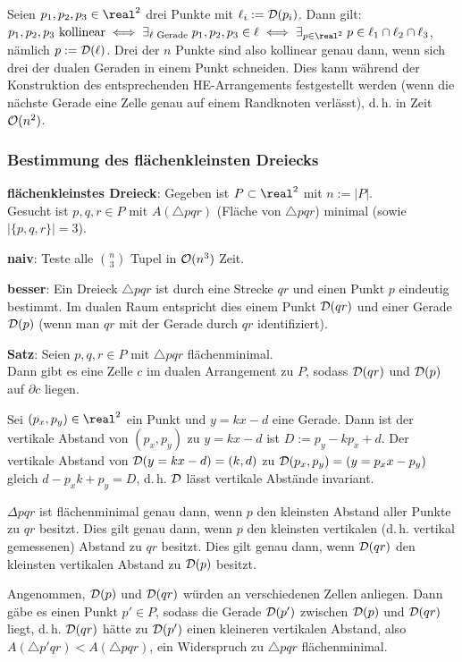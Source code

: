 Seien $p_1, p_2, p_3 \in \real^2$ drei Punkte mit $\ell_i := \mathcal{D}(p_i)$.
Dann gilt:\\
$p_1, p_2, p_3 \text{ kollinear} \iff
\exists_{\ell \text{ Gerade}}\; p_1, p_2, p_3 \in \ell \iff
\exists_{p \in \real^2}\; p \in \ell_1 \cap \ell_2 \cap \ell_3$,
nämlich $p := \mathcal{D}(\ell)$.
Drei der $n$ Punkte sind also kollinear genau dann, wenn sich drei der dualen Geraden in einem
Punkt schneiden.
Dies kann während der Konstruktion des entsprechenden HE-Arrangements festgestellt werden
(wenn die nächste Gerade eine Zelle genau auf einem Randknoten verlässt),
d.\,h. in Zeit $\mathcal{O}(n^2)$.

\pagebreak

\subsubsection{%
    Bestimmung des flächenkleinsten Dreiecks%
}

\textbf{flächenkleinstes Dreieck}:
Gegeben ist $P \subset \real^2$ mit $n := |P|$.\\
Gesucht ist $p, q, r \in P$ mit $A(\triangle pqr)$ (Fläche von $\triangle pqr$) minimal
(sowie $|\{p, q, r\}| = 3$).

\textbf{naiv}:
Teste alle $\binom{n}{3}$ Tupel in $\mathcal{O}(n^3)$ Zeit.

\linie

\textbf{besser}:
Ein Dreieck $\triangle pqr$ ist durch eine Strecke $qr$ und einen Punkt $p$ eindeutig bestimmt.
Im dualen Raum entspricht dies einem Punkt $\mathcal{D}(qr)$ und einer Gerade $\mathcal{D}(p)$
(wenn man $qr$ mit der Gerade durch $qr$ identifiziert).

\textbf{Satz}:
Seien $p, q, r \in P$ mit $\triangle pqr$ flächenminimal.\\
Dann gibt es eine Zelle $c$ im dualen Arrangement zu $P$, sodass
$\mathcal{D}(qr)$ und $\mathcal{D}(p)$ auf $\partial c$ liegen.

\begin{Beweis}
    Sei $(p_x, p_y) \in \real^2$ ein Punkt und $y = kx - d$ eine Gerade.
    Dann ist der vertikale Abstand von $(p_x, p_y)$ zu $y = kx - d$ ist $D := p_y - kp_x + d$.
    Der vertikale Abstand von $\mathcal{D}(y = kx - d) = (k, d)$ zu $\mathcal{D}(p_x, p_y) = (y = p_x x - p_y)$
    gleich $d - p_x k + p_y = D$, d.\,h. $\mathcal{D}$ lässt vertikale Abstände invariant.
    
    $\Delta pqr$ ist flächenminimal genau dann, wenn $p$ den kleinsten Abstand aller Punkte zu
    $qr$ besitzt.
    Dies gilt genau dann, wenn $p$ den kleinsten vertikalen (d.\,h. vertikal gemessenen) Abstand
    zu $qr$ besitzt.
    Dies gilt genau dann, wenn $\mathcal{D}(qr)$ den kleinsten vertikalen Abstand zu $\mathcal{D}(p)$ besitzt.
    
    Angenommen, $\mathcal{D}(p)$ und $\mathcal{D}(qr)$ würden an verschiedenen Zellen anliegen.
    Dann gäbe es einen Punkt $p' \in P$, sodass die Gerade $\mathcal{D}(p')$ zwischen $\mathcal{D}(p)$ und $\mathcal{D}(qr)$
    liegt, d.\,h. $\mathcal{D}(qr)$ hätte zu $\mathcal{D}(p')$ einen kleineren vertikalen Abstand,
    also $A(\triangle p'qr) < A(\triangle pqr)$, ein Widerspruch zu $\triangle pqr$ flächenminimal.
\end{Beweis}

